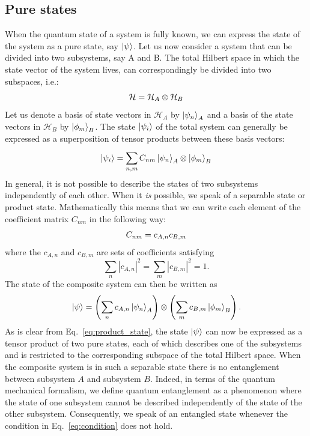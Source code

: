 \documentclass[12pt,oneside,openright]{report}
\theoremstyle{definition}
\theoremstyle{plain}
\theoremstyle{remark}
\begin{document}
\subsection{Pure states}
When the quantum state of a system is fully known, we can express the state of the system as a pure state,
say $\ket{\psi}$. Let us now consider a system that can be divided into two subsystems, say A and B. The total Hilbert 
space in which the state vector of the system lives, can correspondingly be divided into two subspaces, i.e.:
\begin{equation}{\label{eq:bipartite}}
  \mathcal{H} = \mathcal{H}_A \otimes \mathcal{H}_B
\end{equation}
Let us denote a basis of state vectors in $ \mathcal{H} _A$  by $ \ket{\psi_n}_A$ and a basis of the
 state vectors in $ \mathcal{H} _B$  by $ \ket{\phi_m}_B $. The state  $ \ket{\psi_i} $ of the total
 system can generally be expressed as a superposition of tensor products between these basis vectors:
 \begin{equation}
  \ket{\psi_i} = \sum_{n,m}^{} C_{nm} \ket{\psi_n}_A \otimes \ket{\phi_m}_B
  \label{eq:bipartite_superposition}
\end{equation}
In general, it is not possible to describe the states of two subsystems independently of each other. When it \emph{is} possible, we speak of a
separable state or product state. Mathematically this means that we can write each element of the
coefficient matrix $C_{nm}$ in the following way:
\begin{equation}{\label{eq:condition}}
 C_{nm} = c_{A,n} c_{B,m}  
\end{equation}
where the $c_{A,n}$ and $c_{B,m}$ are sets of coefficients satisfying
\begin{equation}
\sum_{n} \left\lvert c_{A,n} \right\rvert^2 = \sum_{m} \left\lvert c_{B,m} \right\rvert^2 = 1.
\end{equation}
The state of the composite system can then be written as
\begin{equation}{\label{eq:product_state}}
\ket{\psi} = \left( \sum_{n} c_{A,n} \ket{\psi_n}_A \right) \otimes \left( \sum_{m} c_{B,m} \ket{\phi_m}_B \right).
\end{equation}
As is clear from Eq.~\eqref{eq:product_state}, the state $\ket{\psi}$ can now be 
expressed as a tensor product of two pure states, each of which describes one of the subsystems
and is restricted to the corresponding subspace of the total Hilbert space. When the composite system
is in such a separable state there is no entanglement between subsystem $A$ and subsystem $B$. Indeed, in terms
of the quantum mechanical formalism, we define quantum entanglement as a phenomenon where the state of one
subsystem cannot be described independently of the state of the other subsystem.
Consequently, we speak of an entangled state whenever the condition in Eq.~\eqref{eq:condition} does not hold.
\end{document}
